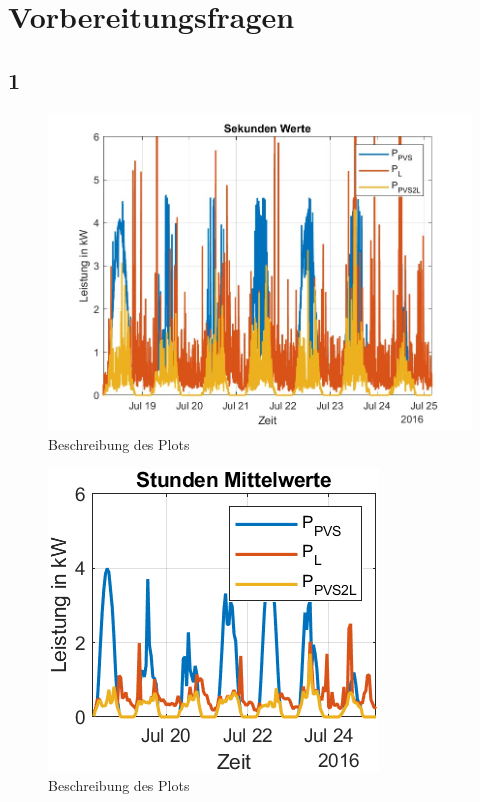 \newpage
\section{Vorbereitungsfragen}
\subsection{1}
\begin{figure}[H]
    \centering
    \includegraphics[width=\textwidth]{Abbildungen/plot.jpg}
    \caption{Beschreibung des Plots}
    \label{fig:plot3062023}
\end{figure}
\begin{figure}[H]
    \centering
    \includegraphics[width=\textwidth]{Abbildungen/aufgabe1_plot2.png}
    \caption{Beschreibung des Plots}
    \label{fig:plot1_2_3062023}
\end{figure}

